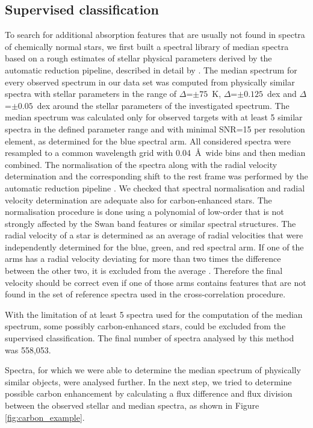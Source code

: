 \subsection{Supervised classification}
\label{sec:supervised}
To search for additional absorption features that are usually not found in spectra of chemically normal stars, we first built a spectral library of median spectra based on a rough estimates of stellar physical parameters derived by the automatic reduction pipeline, described in detail by \citet{2017MNRAS.464.1259K}. The median spectrum for every observed spectrum in our data set was computed from physically similar spectra with stellar parameters in the range of $\Delta$\Teff=$\pm75$~K, $\Delta$\Logg=$\pm0.125$~dex and $\Delta$\Feh=$\pm0.05$~dex around the stellar parameters of the investigated spectrum. The median spectrum was calculated only for observed targets with at least 5 similar spectra in the defined parameter range and with minimal SNR=15 per resolution element, as determined for the blue spectral arm. All considered spectra were resampled to a common wavelength grid with 0.04~\AA\ wide bins and then median combined. The normalisation of the spectra along with the radial velocity determination and the corresponding shift to the rest frame was performed by the automatic reduction pipeline \citep{2017MNRAS.464.1259K}. We checked that spectral normalisation and radial velocity determination are adequate also for carbon-enhanced stars. The normalisation procedure is done using a polynomial of low-order that is not strongly affected by the Swan band features or similar spectral structures. The radial velocity of a star is determined as an average of radial velocities that were independently determined for the blue, green, and red spectral arm. If one of the arms has a radial velocity deviating for more than two times the difference between the other two, it is excluded from the average \citep[further details in][]{2017MNRAS.464.1259K}. Therefore the final velocity should be correct even if one of those arms contains features that are not found in the set of reference spectra used in the cross-correlation procedure.

With the limitation of at least 5 spectra used for the computation of the median spectrum, some possibly carbon-enhanced stars, could be excluded from the supervised classification. The final number of spectra analysed by this method was 558,053.

Spectra, for which we were able to determine the median spectrum of physically similar objects, were analysed further. In the next step, we tried to determine possible carbon enhancement by calculating a flux difference and flux division between the observed stellar and median spectra, as shown in Figure \ref{fig:carbon_example}.

